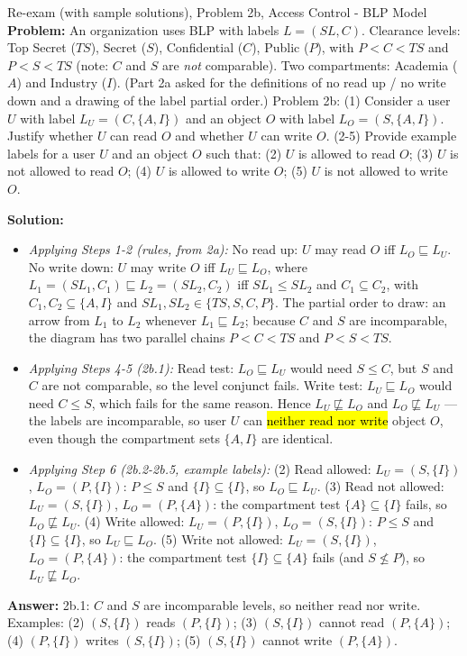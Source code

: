 \documentclass[12pt, a4paper]{article}
\newcommand{\imp}[1]{\hl{#1}}                       %
\begin{document}
\begin{practicebox}{Re-exam (with sample solutions), Problem 2b, Access Control - BLP Model}
\textbf{Problem:} An organization uses BLP with labels $L = (SL, C)$. Clearance levels: Top Secret ($TS$), Secret ($S$), Confidential ($C$), Public ($P$), with $P < C < TS$ and $P < S < TS$ (note: $C$ and $S$ are \emph{not} comparable). Two compartments: Academia ($A$) and Industry ($I$). (Part 2a asked for the definitions of no read up / no write down and a drawing of the label partial order.) Problem 2b: (1) Consider a user $U$ with label $L_U = (C, \{A, I\})$ and an object $O$ with label $L_O = (S, \{A, I\})$. Justify whether $U$ can read $O$ and whether $U$ can write $O$. (2-5) Provide example labels for a user $U$ and an object $O$ such that: (2) $U$ is allowed to read $O$; (3) $U$ is not allowed to read $O$; (4) $U$ is allowed to write $O$; (5) $U$ is not allowed to write $O$.

\textbf{Solution:}
\begin{itemize}
    \item \textit{Applying Steps 1-2 (rules, from 2a):} No read up: $U$ may read $O$ iff $L_O \sqsubseteq L_U$. No write down: $U$ may write $O$ iff $L_U \sqsubseteq L_O$, where $L_1 = (SL_1, C_1) \sqsubseteq L_2 = (SL_2, C_2)$ iff $SL_1 \leq SL_2$ and $C_1 \subseteq C_2$, with $C_1, C_2 \subseteq \{A, I\}$ and $SL_1, SL_2 \in \{TS, S, C, P\}$. The partial order to draw: an arrow from $L_1$ to $L_2$ whenever $L_1 \sqsubseteq L_2$; because $C$ and $S$ are incomparable, the diagram has two parallel chains $P < C < TS$ and $P < S < TS$.
    \item \textit{Applying Steps 4-5 (2b.1):} Read test: $L_O \sqsubseteq L_U$ would need $S \leq C$, but $S$ and $C$ are not comparable, so the level conjunct fails. Write test: $L_U \sqsubseteq L_O$ would need $C \leq S$, which fails for the same reason. Hence $L_U \not\sqsubseteq L_O$ and $L_O \not\sqsubseteq L_U$ --- the labels are incomparable, so user $U$ can \imp{neither read nor write} object $O$, even though the compartment sets $\{A, I\}$ are identical.
    \item \textit{Applying Step 6 (2b.2-2b.5, example labels):} (2) Read allowed: $L_U = (S, \{I\})$, $L_O = (P, \{I\})$: $P \leq S$ and $\{I\} \subseteq \{I\}$, so $L_O \sqsubseteq L_U$. (3) Read not allowed: $L_U = (S, \{I\})$, $L_O = (P, \{A\})$: the compartment test $\{A\} \subseteq \{I\}$ fails, so $L_O \not\sqsubseteq L_U$. (4) Write allowed: $L_U = (P, \{I\})$, $L_O = (S, \{I\})$: $P \leq S$ and $\{I\} \subseteq \{I\}$, so $L_U \sqsubseteq L_O$. (5) Write not allowed: $L_U = (S, \{I\})$, $L_O = (P, \{A\})$: the compartment test $\{I\} \subseteq \{A\}$ fails (and $S \not\leq P$), so $L_U \not\sqsubseteq L_O$.
\end{itemize}
\textbf{Answer:} 2b.1: $C$ and $S$ are incomparable levels, so neither read nor write. Examples: (2) $(S,\{I\})$ reads $(P,\{I\})$; (3) $(S,\{I\})$ cannot read $(P,\{A\})$; (4) $(P,\{I\})$ writes $(S,\{I\})$; (5) $(S,\{I\})$ cannot write $(P,\{A\})$.
\end{practicebox}
\end{document}
